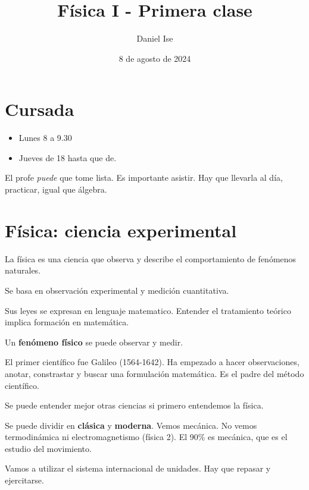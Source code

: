 \documentclass{article}
\title{Física I - Primera clase}
\author{Daniel Ise}
\date{8 de agosto de 2024}
\begin{document}
\maketitle

\section*{Cursada}
\begin{itemize}
    \item Lunes 8 a 9.30
    \item Jueves de 18 hasta que de.
\end{itemize}

El profe \textit{puede} que tome lista. Es importante
asistir. Hay que llevarla al día, practicar, igual que álgebra.

\section*{Física: ciencia experimental}

La física es una ciencia que observa y describe el comportamiento de fenómenos naturales.

Se basa en observación experimental y medición cuantitativa. 

Sus leyes se expresan en lenguaje matematico. Entender el tratamiento teórico
implica formación en matemática.

Un \textbf{fenómeno físico} se puede observar y medir. 

El primer científico fue Galileo (1564-1642). Ha empezado a hacer observaciones,
anotar, constrastar y buscar una formulación matemática. Es el padre del método
científico. 

Se puede entender mejor otras ciencias si primero entendemos la física. 

Se puede dividir en \textbf{clásica} y \textbf{moderna}. Vemos mecánica. No 
vemos termodinámica ni electromagnetismo (física 2). El 90\% es mecánica, que es
el estudio del movimiento. 

Vamos a utilizar el sistema internacional de unidades. Hay que repasar y ejercitarse.
\end{document}
